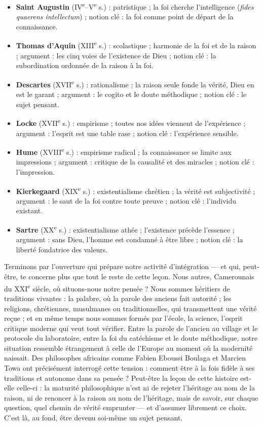 \documentclass[11pt]{article}
\begin{document}
\begin{corrige}[Exercice 1]
\begin{itemize}
\item \textbf{Saint Augustin} (IV\textsuperscript{e}--V\textsuperscript{e} s.) : patristique ; la foi cherche l'intelligence (\emph{fides quaerens intellectum}) ; notion clé : la foi comme point de départ de la connaissance.
\item \textbf{Thomas d'Aquin} (XIII\textsuperscript{e} s.) : scolastique ; harmonie de la foi et de la raison ; argument : les cinq voies de l'existence de Dieu ; notion clé : la subordination ordonnée de la raison à la foi.
\item \textbf{Descartes} (XVII\textsuperscript{e} s.) : rationalisme ; la raison seule fonde la vérité, Dieu en est le garant ; argument : le cogito et le doute méthodique ; notion clé : le sujet pensant.
\item \textbf{Locke} (XVII\textsuperscript{e} s.) : empirisme ; toutes nos idées viennent de l'expérience ; argument : l'esprit est une table rase ; notion clé : l'expérience sensible.
\item \textbf{Hume} (XVIII\textsuperscript{e} s.) : empirisme radical ; la connaissance se limite aux impressions ; argument : critique de la causalité et des miracles ; notion clé : l'impression.
\item \textbf{Kierkegaard} (XIX\textsuperscript{e} s.) : existentialisme chrétien ; la vérité est subjectivité ; argument : le saut de la foi contre toute preuve ; notion clé : l'individu existant.
\item \textbf{Sartre} (XX\textsuperscript{e} s.) : existentialisme athée ; l'existence précède l'essence ; argument : sans Dieu, l'homme est condamné à être libre ; notion clé : la liberté fondatrice des valeurs.
\end{itemize}
\end{corrige}

Terminons par l'ouverture qui prépare notre activité d'intégration — et qui, peut-être, te concerne plus que tout le reste de cette leçon. Nous autres, Camerounais du XXI\textsuperscript{e} siècle, où situons-nous notre pensée ? Nous sommes héritiers de traditions vivantes : la palabre, où la parole des anciens fait autorité ; les religions, chrétiennes, musulmanes ou traditionnelles, qui transmettent une vérité reçue ; et en même temps nous sommes formés par l'école, la science, l'esprit critique moderne qui veut tout vérifier. Entre la parole de l'ancien au village et le protocole du laboratoire, entre la foi du catéchisme et le doute méthodique, notre situation ressemble étrangement à celle de l'Europe au moment où la modernité naissait. Des philosophes africains comme Fabien Eboussi Boulaga et Marcien Towa ont précisément interrogé cette tension : comment être à la fois fidèle à ses traditions et autonome dans sa pensée ? Peut-être la leçon de cette histoire est-elle celle-ci : la maturité philosophique n'est ni de rejeter l'héritage au nom de la raison, ni de renoncer à la raison au nom de l'héritage, mais de savoir, sur chaque question, quel chemin de vérité emprunter — et d'assumer librement ce choix. C'est là, au fond, être devenu soi-même un sujet pensant.
\end{document}
